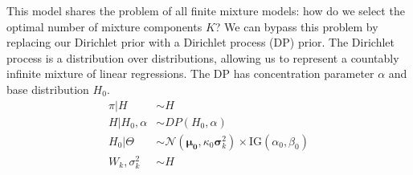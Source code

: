 \documentclass[10pt]{proc}
\begin{document}
This model shares the problem of all finite mixture models: how do we select the
optimal number of mixture components $K$? We can bypass this problem by
replacing our Dirichlet prior with a Dirichlet process (DP) prior. The Dirichlet
process is a distribution over distributions, allowing us to represent a
countably infinite mixture of linear regressions. The DP has concentration
parameter $\alpha$ and base distribution $H_0$.
%
\begin{align}
    \pi | H &\sim H  \\
    H | H_0, \alpha &\sim DP(H_0, \alpha)  \\
    H_0 | \Theta &\sim \mathcal{N}\left(
        \bm{\mu_0}, \kappa_0 \bm{\sigma}_k^2
    \right) \times \text{IG}(\alpha_0, \beta_0) \\
    W_k, \sigma_k^2 &\sim H
\end{align}
\end{document}
